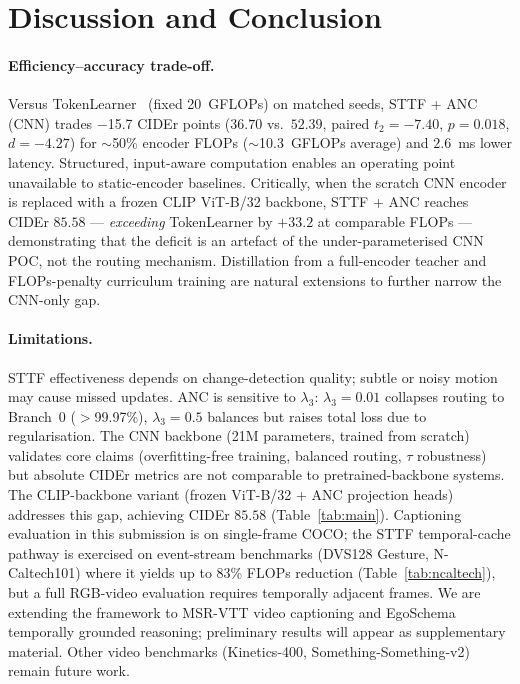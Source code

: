\documentclass{article}
\begin{document}
\section{Discussion and Conclusion}

\paragraph{Efficiency--accuracy trade-off.}
Versus TokenLearner~\cite{ryoo2021tokenlearner} (fixed 20~GFLOPs) on matched seeds, STTF + ANC (CNN) trades $-$15.7 CIDEr points ($36.70$ vs.\ $52.39$, paired $t_{2}{=}{-}7.40$, $p{=}0.018$, $d{=}{-}4.27$) for $\sim$50\% encoder FLOPs ($\sim$10.3~GFLOPs average) and $2.6$~ms lower latency. Structured, input-aware computation enables an operating point unavailable to static-encoder baselines. Critically, when the scratch CNN encoder is replaced with a frozen CLIP ViT-B/32 backbone, STTF + ANC reaches CIDEr $85.58$ — \emph{exceeding} TokenLearner by $+33.2$ at comparable FLOPs — demonstrating that the deficit is an artefact of the under-parameterised CNN POC, not the routing mechanism. Distillation from a full-encoder teacher and FLOPs-penalty curriculum training are natural extensions to further narrow the CNN-only gap.

\paragraph{Limitations.}
STTF effectiveness depends on change-detection quality; subtle or noisy motion may cause missed updates. ANC is sensitive to $\lambda_3$: $\lambda_3{=}0.01$ collapses routing to Branch~0 ($>$99.97\%), $\lambda_3{=}0.5$ balances but raises total loss due to regularisation. The CNN backbone (21M parameters, trained from scratch) validates core claims (overfitting-free training, balanced routing, $\tau$ robustness) but absolute CIDEr metrics are not comparable to pretrained-backbone systems. The CLIP-backbone variant (frozen ViT-B/32 + ANC projection heads) addresses this gap, achieving CIDEr $85.58$ (Table~\ref{tab:main}). Captioning evaluation in this submission is on single-frame COCO; the STTF temporal-cache pathway is exercised on event-stream benchmarks (DVS128 Gesture, N-Caltech101) where it yields up to 83\% FLOPs reduction (Table~\ref{tab:ncaltech}), but a full RGB-video evaluation requires temporally adjacent frames. We are extending the framework to MSR-VTT video captioning and EgoSchema temporally grounded reasoning; preliminary results will appear as supplementary material. Other video benchmarks (Kinetics-400, Something-Something-v2) remain future work.
\end{document}
